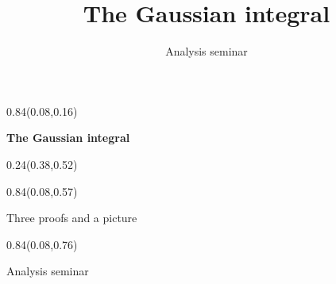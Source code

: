\documentclass[aspectratio=169]{beamer}
\title{The Gaussian integral}
\author{Analysis seminar}
\begin{document}
\begin{frame}[t]

\begin{textblock}{0.84}(0.08,0.16)
{\centering\fontsize{32}{38}\selectfont \textcolor[HTML]{1A1A1A}{\textbf{The Gaussian integral}}\par}
\end{textblock}

\begin{textblock}{0.24}(0.38,0.52)
\end{textblock}

\begin{textblock}{0.84}(0.08,0.57)
{\centering\fontsize{17}{20}\selectfont \textcolor[HTML]{555555}{Three proofs and a picture}\par}
\end{textblock}

\begin{textblock}{0.84}(0.08,0.76)
{\centering\fontsize{13}{16}\selectfont \textcolor[HTML]{555555}{Analysis seminar}\par}
\end{textblock}
\end{frame}
\end{document}

